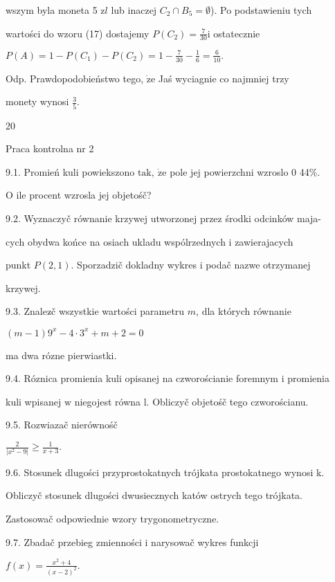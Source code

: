 \documentclass[a4paper,12pt]{article}
\begin{document}
wszym byla moneta 5 $\mathrm{z}l$ lub inaczej $ C_{2}\cap B_{5}=\emptyset$). Po podstawieniu tych

wartości do wzoru (17) dostajemy $P(C_{2})=\displaystyle \frac{7}{30}\mathrm{i}$ ostatecznie

$P(A)=1-P(C_{1})-P(C_{2})=1-\displaystyle \frac{7}{30}-\frac{1}{6}=\frac{6}{10}.$

Odp. Prawdopodobieństwo tego, $\dot{\mathrm{z}}\mathrm{e}$ Jaś wyciagnie co najmniej trzy

monety wynosi $\displaystyle \frac{3}{5}.$





20

Praca kontrolna nr 2

9.1. Promień kuli powiekszono $\mathrm{t}\mathrm{a}\mathrm{k},\ \dot{\mathrm{z}}\mathrm{e}$ pole jej powierzchni wzroslo $0$ 44\%.

$\mathrm{O}$ ile procent wzrosla jej objetośč?

9.2. Wyznaczyč równanie krzywej utworzonej przez środki odcinków maja-

cych obydwa końce na osiach ukladu wspólrzednych $\mathrm{i}$ zawierajacych

punkt $P(2,1)$. Sporzadzič dokladny wykres $\mathrm{i}$ podač nazwe otrzymanej

krzywej.

9.3. Znalez$\acute{}$č wszystkie wartości parametru $m$, dla których równanie

$(m-1)9^{x}-4\cdot 3^{x}+m+2=0$

ma dwa rózne pierwiastki.

9.4. Róznica promienia kuli opisanej na czworościanie foremnym $\mathrm{i}$ promienia

kuli wpisanej $\mathrm{w}$ niegojest równa l. Obliczyč objetośč tego czworościanu.

9.5. Rozwiazač nierównośč

$\displaystyle \frac{2}{|x^{2}-9|}\geq\frac{1}{x+3}.$

9.6. Stosunek dlugości przyprostokatnych trójkata prostokatnego wynosi k.

Obliczyč stosunek dlugości dwusiecznych katów ostrych tego trójkata.

Zastosowač odpowiednie wzory trygonometryczne.

9.7. Zbadač przebieg zmienności i narysowač wykres funkcji

$f(x)=\displaystyle \frac{x^{2}+4}{(x-2)^{2}}.$
\end{document}
